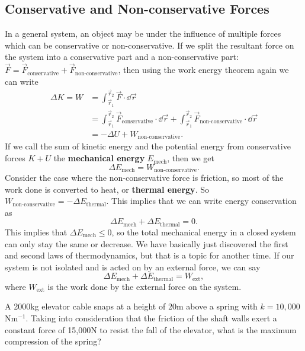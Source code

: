 \documentclass[../classical_mechanics.tex]{subfiles}
\begin{document}
        \subsection{Conservative and Non-conservative Forces}\label{subsec:conservative-and-non-conservative-forces}
            In a general system, an object may be under the influence of multiple forces which can be conservative or non-conservative.
            If we split the resultant force on the system into a conservative part and a non-conservative part: $\vec{F}=\vec{F}_\text{conservative}+\vec{F}_\text{non-conservative}$, then using the work energy theorem again we can write
            \begin{align}
                \Delta K=W&=\int_{\vec{r}_1}^{\vec{r}_2}\vec{F}\cdot\dd{\vec{r}}\\
                &=\int_{\vec{r}_1}^{\vec{r}_2}\vec{F}_\text{conservative}\cdot\dd{\vec{r}}+\int_{\vec{r}_1}^{\vec{r}_2}\vec{F}_\text{non-conservative}\cdot\dd{\vec{r}}\\
                &=-\Delta U+W_\text{non-conservative}.
            \end{align}
            If we call the sum of kinetic energy and the potential energy from conservative forces $K+U$ the \textbf{mechanical energy} $E_\text{mech}$, then we get
            \begin{equation}
                \Delta E_\text{mech}=W_\text{non-conservative}.
            \end{equation}
            Consider the case where the non-conservative force is friction, so most of the work done is converted to heat, or \textbf{thermal energy}.
            So $W_\text{non-conservative}=-\Delta E_\text{thermal}$.
            This implies that we can write energy conservation as
            \begin{equation}
                \Delta E_\text{mech}+\Delta E_\text{thermal}=0.
            \end{equation}
            This implies that $\Delta E_\text{mech}\leq 0$, so the total mechanical energy in a closed system can only stay the same or decrease.
            We have basically just discovered the first and second laws of thermodynamics, but that is a topic for another time.
            If our system is not isolated and is acted on by an external force, we can say
            \begin{equation}
                \Delta E_\text{mech}+\Delta E_\text{thermal}=W_\text{ext},
            \end{equation}
            where $W_\text{ext}$ is the work done by the external force on the system.
            \begin{example}
                A 2000kg elevator cable snaps at a height of 20m above a spring with $k=10,000$Nm$^{-1}$.
                Taking into consideration that the friction of the shaft walls exert a constant force of 15,000N to resist the fall of the elevator, what is the maximum compression of the spring?
            \end{example}
\end{document}
